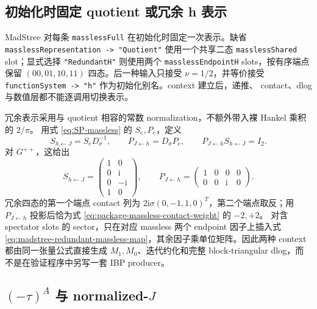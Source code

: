 \documentclass[11pt,a4paper]{ctexart}
\newcommand{\ii}{\mathrm i}
\begin{document}
\subsection{初始化时固定 quotient 或冗余 h 表示}

MadStree 对每条 \texttt{masslessFull} 在初始化时固定一次表示。缺省
\texttt{masslessRepresentation -> "Quotient"} 使用一个共享二态
\texttt{masslessShared} slot；显式选择 \texttt{"RedundantH"} 则使用两个
\texttt{masslessEndpointH} slots，按有序端点保留 $(00,01,10,11)$ 四态。后一种输入只接受
$\nu=1/2$，并等价接受 \texttt{functionSystem -> "h"} 作为初始化别名。context 建立后，递推、
contact、dlog 与数值层都不能逐调用切换表示。

冗余表示采用与 quotient 相容的常数 normalization，不额外带入裸 Hankel 乘积的 $2/\pi$。
用式 \eqref{eq:SP-massless} 的 $S_e,P_e$，定义
\begin{equation}
 S_{h\leftarrow J}=S_eD_{\sigma}^{-1},\qquad
 P_{J\leftarrow h}=D_{\sigma}P_e,\qquad
 P_{J\leftarrow h}S_{h\leftarrow J}=I_2.
 \label{eq:madstree-redundant-massless-map}
\end{equation}
对 $G^{++}$，这给出
\begin{equation}
 S_{h\leftarrow J}=\begin{pmatrix}1&0\\0&\ii\\0&-\ii\\1&0\end{pmatrix},
 \qquad
 P_{J\leftarrow h}=\begin{pmatrix}1&0&0&0\\0&0&\ii&0\end{pmatrix}.
\end{equation}
冗余四态的第一个端点 contact 列为
$2\ii\sigma(0,-1,1,0)^T$，第二个端点取反；用
$P_{J\leftarrow h}$ 投影后恰为式 \eqref{eq:package-massless-contact-weight} 的 $-2,+2$。
对含 spectator slots 的 sector，只在对应 massless 两个 endpoint 因子上插入式
\eqref{eq:madstree-redundant-massless-map}，其余因子乘单位矩阵。因此两种 context 都由同一张量公式直接生成
$M_1,M_0$、迭代约化和完整 block-triangular dlog，而不是在验证程序中另写一套 IBP producer。

\subsection{\texorpdfstring{$(-\tau)^A$ 与 normalized-$J$}{(-tau)A 与 normalized-J}}
\end{document}

